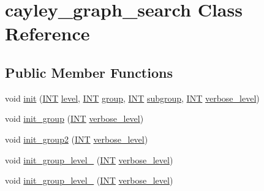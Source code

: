 \hypertarget{classcayley__graph__search}{}\section{cayley\+\_\+graph\+\_\+search Class Reference}
\label{classcayley__graph__search}
\subsection*{Public Member Functions}
\begin{DoxyCompactItemize}
\item 
void \mbox{\hyperlink{classcayley__graph__search_add9c6434abeaebac4a07bc03cb21672d}{init}} (\mbox{\hyperlink{galois_8h_a09fddde158a3a20bd2dcadb609de11dc}{I\+NT}} \mbox{\hyperlink{classcayley__graph__search_afcee51b65f14587a84ae0a77affb9053}{level}}, \mbox{\hyperlink{galois_8h_a09fddde158a3a20bd2dcadb609de11dc}{I\+NT}} \mbox{\hyperlink{classgroup}{group}}, \mbox{\hyperlink{galois_8h_a09fddde158a3a20bd2dcadb609de11dc}{I\+NT}} \mbox{\hyperlink{classsubgroup}{subgroup}}, \mbox{\hyperlink{galois_8h_a09fddde158a3a20bd2dcadb609de11dc}{I\+NT}} \mbox{\hyperlink{simeon_8_c_a818073fbcc2f439e7c56952f67386122}{verbose\+\_\+level}})
\item 
void \mbox{\hyperlink{classcayley__graph__search_adbce2e517a8ed979f53e8aeb043cf4ca}{init\+\_\+group}} (\mbox{\hyperlink{galois_8h_a09fddde158a3a20bd2dcadb609de11dc}{I\+NT}} \mbox{\hyperlink{simeon_8_c_a818073fbcc2f439e7c56952f67386122}{verbose\+\_\+level}})
\item 
void \mbox{\hyperlink{classcayley__graph__search_ac765646a4795740d7ac0a9407bf35f32}{init\+\_\+group2}} (\mbox{\hyperlink{galois_8h_a09fddde158a3a20bd2dcadb609de11dc}{I\+NT}} \mbox{\hyperlink{simeon_8_c_a818073fbcc2f439e7c56952f67386122}{verbose\+\_\+level}})
\item 
void \mbox{\hyperlink{classcayley__graph__search_a7c936e674e8ea64597fa37ae5aa71c71}{init\+\_\+group\+\_\+level\+\_}} (\mbox{\hyperlink{galois_8h_a09fddde158a3a20bd2dcadb609de11dc}{I\+NT}} \mbox{\hyperlink{simeon_8_c_a818073fbcc2f439e7c56952f67386122}{verbose\+\_\+level}})
\item 
void \mbox{\hyperlink{classcayley__graph__search_a6593f90cd91bea8c23fe71acca05655e}{init\+\_\+group\+\_\+level\+\_}} (\mbox{\hyperlink{galois_8h_a09fddde158a3a20bd2dcadb609de11dc}{I\+NT}} \mbox{\hyperlink{simeon_8_c_a818073fbcc2f439e7c56952f67386122}{verbose\+\_\+level}})
\item 

\end{DoxyCompactItemize}
